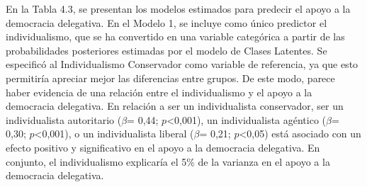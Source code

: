 \documentclass[12pt,twoside]{templates/facsothesis}
\begin{document}
En la Tabla 4.3, se presentan los modelos estimados para predecir el apoyo a la democracia delegativa. En el Modelo 1, se incluye como único predictor el individualismo, que se ha convertido en una variable categórica a partir de las probabilidades posteriores estimadas por el modelo de Clases Latentes. Se especificó al Individualismo Conservador como variable de referencia, ya que esto permitiría apreciar mejor las diferencias entre grupos. De este modo, parece haber evidencia de una relación entre el individualismo y el apoyo a la democracia delegativa. En relación a ser un individualista conservador, ser un individualista autoritario (\(\beta\)= 0,44; \(p\)\textless0,001), un individualista agéntico (\(\beta\)= 0,30; \(p\)\textless0,001), o un individualista liberal (\(\beta\)= 0,21; \(p\)\textless0,05) está asociado con un efecto positivo y significativo en el apoyo a la democracia delegativa. En conjunto, el individualismo explicaría el 5\% de la varianza en el apoyo a la democracia delegativa.
\end{document}
